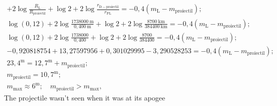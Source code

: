 \begin{description}
\begin{gather*}
      + 2\log\frac{R_{\mathrm{L}}}{R_{\mathrm{proiectil}}} + \log2
      + 2\log\frac{r_{\mathrm{D-proiectil}}}{r_{\mathrm{PL}}}
      = -0{,}4\left(m_{\mathrm{L}} - m_{\mathrm{proiectil}}\right); \\
    \log(0{,}12) + 2\log\frac{1738000\ \mathrm{m}}{0{,}400\ \mathrm{m}}
      + \log2 + 2\log\frac{8700\ \mathrm{km}}{384400\ \mathrm{km}}
      = -0{,}4\left(m_{\mathrm{L}} - m_{\mathrm{proiectil}}\right); \\
    \log(0{,}12) + 2\log\frac{1738000}{0{,}400} + \log2
      + 2\log\frac{8700}{384400}
      = -0{,}4\left(m_{\mathrm{L}} - m_{\mathrm{proiectil}}\right); \\
    -0{,}920818754 + 13{,}27597956 + 0{,}301029995 - 3{,}290528253
      = -0{,}4\left(m_{\mathrm{L}} - m_{\mathrm{proiectil}}\right); \\
    23{,}4^{\mathrm{m}} = 12{,}7^{\mathrm{m}} + m_{\mathrm{proiectil}}; \\
    m_{\mathrm{proiectil}} = 10{,}7^{\mathrm{m}}; \\
    m_{\max} \approx 6^{\mathrm{m}};\quad
      m_{\mathrm{proiectil}} > m_{\max},
  \end{gather*}
  The projectile wasn't seen when it was at its apogee
\end{description}
